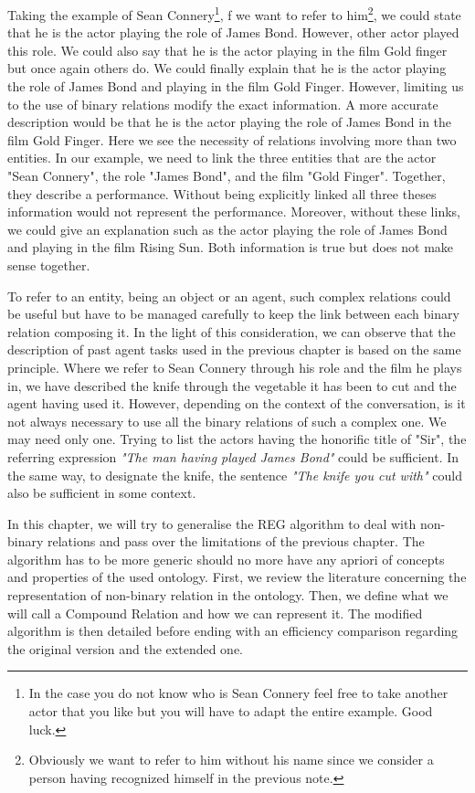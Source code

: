 Taking the example of Sean Connery\footnote{In the case you do not know who is Sean Connery feel free to take another actor that you like but you will have to adapt the entire example. Good luck.}, f we want to refer to him\footnote{Obviously we want to refer to him without his name since we consider a person having recognized himself in the previous note.}, we could state that he is the actor playing the role of James Bond. However, other actor played this role. We could also say that he is the actor playing in the film Gold finger but once again others do. We could finally explain that he is the actor playing the role of James Bond and playing in the film Gold Finger. However, limiting us to the use of binary relations modify the exact information. A more accurate description would be that he is the actor playing the role of James Bond in the film Gold Finger. Here we see the necessity of relations involving more than two entities. In our example, we need to link the three entities that are the actor "Sean Connery", the role "James Bond", and the film "Gold Finger". Together, they describe a performance. Without being explicitly linked all three theses information would not represent the performance. Moreover, without these links, we could give an explanation such as the actor playing the role of James Bond and playing in the film Rising Sun. Both information is true but does not make sense together.

To refer to an entity, being an object or an agent, such complex relations could be useful but have to be managed carefully to keep the link between each binary relation composing it. In the light of this consideration, we can observe that the description of past agent tasks used in the previous chapter is based on the same principle. Where we refer to Sean Connery through his role and the film he plays in, we have described the knife through the vegetable it has been to cut and the agent having used it. However, depending on the context of the conversation, is it not always necessary to use all the binary relations of such a complex one. We may need only one. Trying to list the actors having the honorific title of "Sir", the referring expression \textit{"The man having played James Bond"} could be sufficient. In the same way, to designate the knife, the sentence \textit{"The knife you cut with"} could also be sufficient in some context.

In this chapter, we will try to generalise the REG algorithm to deal with non-binary relations and pass over the limitations of the previous chapter. The algorithm has to be more generic should no more have any apriori of concepts and properties of the used ontology.
First, we review the literature concerning the representation of non-binary relation in the ontology. Then, we define what we will call a Compound Relation and how we can represent it. The modified algorithm is then detailed before ending with an efficiency comparison regarding the original version and the extended one.

